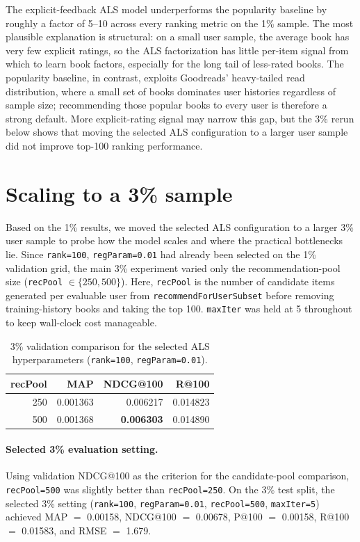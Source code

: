 \documentclass[10pt,twocolumn]{article}
\begin{document}
The explicit-feedback ALS model underperforms the popularity baseline by roughly a factor of 5--10 across every ranking metric on the 1\% sample. The most plausible explanation is structural: on a small user sample, the average book has very few explicit ratings, so the ALS factorization has little per-item signal from which to learn book factors, especially for the long tail of less-rated books. The popularity baseline, in contrast, exploits Goodreads' heavy-tailed read distribution, where a small set of books dominates user histories regardless of sample size; recommending those popular books to every user is therefore a strong default. More explicit-rating signal may narrow this gap, but the 3\% rerun below shows that moving the selected ALS configuration to a larger user sample did not improve top-100 ranking performance.

\section{Scaling to a 3\% sample}\label{sec:scaling}
Based on the 1\% results, we moved the selected ALS configuration to a larger 3\% user sample to probe how the model scales and where the practical bottlenecks lie. Since \texttt{rank=100}, \texttt{regParam=0.01} had already been selected on the 1\% validation grid, the main 3\% experiment varied only the recommendation-pool size (\texttt{recPool} $\in \{250, 500\}$). Here, \texttt{recPool} is the number of candidate items generated per evaluable user from \texttt{recommendForUserSubset} before removing training-history books and taking the top 100. \texttt{maxIter} was held at 5 throughout to keep wall-clock cost manageable.

\begin{table}[!ht]
\centering
\caption{3\% validation comparison for the selected ALS hyperparameters (\texttt{rank=100}, \texttt{regParam=0.01}).}
\label{tab:sweep3pct}
\footnotesize
\setlength{\tabcolsep}{3pt}
\begin{tabular}{r r r r}
\toprule
\textbf{recPool} & \textbf{MAP} & \textbf{NDCG@100} & \textbf{R@100} \\
\midrule
250 & 0.001363 & 0.006217          & 0.014823 \\
500 & 0.001368 & \textbf{0.006303} & 0.014890 \\
\bottomrule
\end{tabular}
\end{table}

\paragraph{Selected 3\% evaluation setting.} Using validation NDCG@100 as the criterion for the candidate-pool comparison, \texttt{recPool=500} was slightly better than \texttt{recPool=250}. On the 3\% test split, the selected 3\% setting (\texttt{rank=100}, \texttt{regParam=0.01}, \texttt{recPool=500}, \texttt{maxIter=5}) achieved MAP $=$ 0.00158, NDCG@100 $=$ 0.00678, P@100 $=$ 0.00158, R@100 $=$ 0.01583, and RMSE $=$ 1.679.
\end{document}

